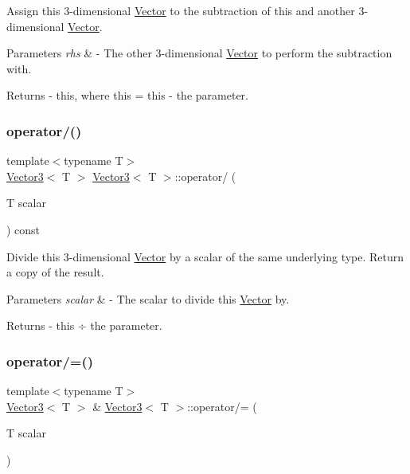 Assign this 3-\/dimensional \mbox{\hyperlink{class_vector}{Vector}} to the subtraction of this and another 3-\/dimensional \mbox{\hyperlink{class_vector}{Vector}}. 
\begin{DoxyParams}{Parameters}
{\em rhs} & -\/ The other 3-\/dimensional \mbox{\hyperlink{class_vector}{Vector}} to perform the subtraction with. \\
\hline
\end{DoxyParams}
\begin{DoxyReturn}{Returns}
-\/ this, where \textquotesingle{}this = this -\/ the parameter\textquotesingle{}. 
\end{DoxyReturn}
\mbox{\label{class_vector3_a50099461c7eeb5471b022918de5c86c3}} 
\subsubsection{\texorpdfstring{operator/()}{operator/()}}
{\footnotesize\ttfamily template$<$typename T$>$ \\
\mbox{\hyperlink{class_vector3}{Vector3}}$<$ T $>$ \mbox{\hyperlink{class_vector3}{Vector3}}$<$ T $>$\+::operator/ (\begin{DoxyParamCaption}\item[{T}]{scalar }\end{DoxyParamCaption}) const}

Divide this 3-\/dimensional \mbox{\hyperlink{class_vector}{Vector}} by a scalar of the same underlying type. Return a copy of the result. 
\begin{DoxyParams}{Parameters}
{\em scalar} & -\/ The scalar to divide this \mbox{\hyperlink{class_vector}{Vector}} by. \\
\hline
\end{DoxyParams}
\begin{DoxyReturn}{Returns}
-\/ this ÷ the parameter. 
\end{DoxyReturn}
\mbox{\label{class_vector3_a1fa0486589a5b3e0110902bb5ffa6d71}} 
\subsubsection{\texorpdfstring{operator/=()}{operator/=()}}
{\footnotesize\ttfamily template$<$typename T$>$ \\
\mbox{\hyperlink{class_vector3}{Vector3}}$<$ T $>$ \& \mbox{\hyperlink{class_vector3}{Vector3}}$<$ T $>$\+::operator/= (\begin{DoxyParamCaption}\item[{T}]{scalar }\end{DoxyParamCaption})}

